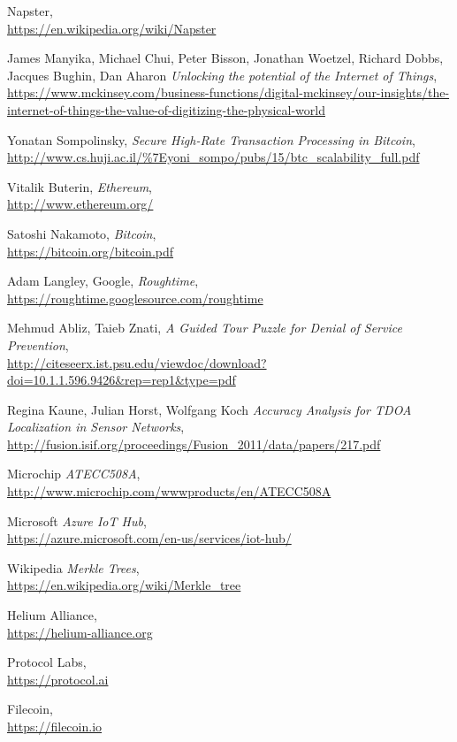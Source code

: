 \documentclass[letterpaper,11pt]{article}
\begin{document}
\begin{thebibliography}{9}

	Napster, \\
		\url{https://en.wikipedia.org/wiki/Napster}

	James Manyika, Michael Chui, Peter Bisson, Jonathan Woetzel, Richard Dobbs, Jacques Bughin, Dan Aharon
		\textit{Unlocking the potential of the Internet of Things}, \\
		\url{https://www.mckinsey.com/business-functions/digital-mckinsey/our-insights/the-internet-of-things-the-value-of-digitizing-the-physical-world}

	Yonatan Sompolinsky,
		\textit{Secure High-Rate Transaction Processing in Bitcoin}, \\
		\url{http://www.cs.huji.ac.il/\%7Eyoni\_sompo/pubs/15/btc\_scalability\_full.pdf}

	Vitalik Buterin,
		\textit{Ethereum},\\
		\url{http://www.ethereum.org/}

	Satoshi Nakamoto,
		\textit{Bitcoin}, \\
		\url{https://bitcoin.org/bitcoin.pdf}

	Adam Langley, Google,
		\textit{Roughtime}, \\
		\url{https://roughtime.googlesource.com/roughtime}

	Mehmud Abliz, Taieb Znati,
		\textit{A Guided Tour Puzzle for Denial of Service Prevention}, \\
		\url{http://citeseerx.ist.psu.edu/viewdoc/download?doi=10.1.1.596.9426&rep=rep1&type=pdf}

	Regina Kaune, Julian Horst, Wolfgang Koch
		\textit{Accuracy Analysis for TDOA Localization in Sensor Networks}, \\
		\url{http://fusion.isif.org/proceedings/Fusion_2011/data/papers/217.pdf}

	Microchip
		\textit{ATECC508A}, \\
		\url{http://www.microchip.com/wwwproducts/en/ATECC508A}

	Microsoft
		\textit{Azure IoT Hub}, \\
		\url{https://azure.microsoft.com/en-us/services/iot-hub/}

	Wikipedia
		\textit{Merkle Trees}, \\
		\url{https://en.wikipedia.org/wiki/Merkle_tree}

	Helium Alliance, \\
		\url{https://helium-alliance.org}

	Protocol Labs, \\
		\url{https://protocol.ai}

	Filecoin, \\
		\url{https://filecoin.io}

\end{thebibliography}
\end{document}

